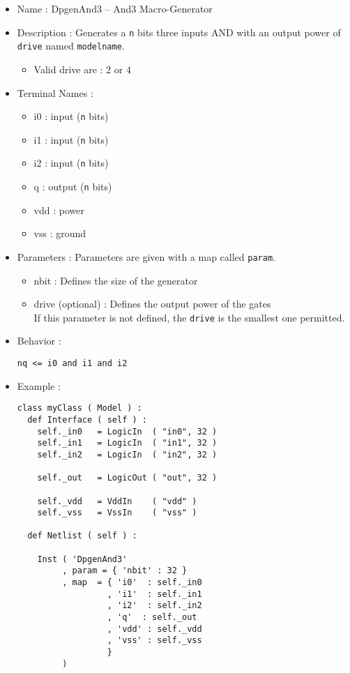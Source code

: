 \begin{itemize}
    \item Name : DpgenAnd3 -- And3 Macro-Generator
    \item Description : Generates a \verb-n- bits three inputs AND with an output power of \verb-drive- named \verb-modelname-.
    \begin{itemize}
        \item Valid drive are : 2 or 4
    \end{itemize}
    \item Terminal Names :
    \begin{itemize}
        \item i0 : input (\verb-n- bits)
        \item i1 : input (\verb-n- bits)
        \item i2 : input (\verb-n- bits)
        \item q : output (\verb-n- bits)
        \item vdd : power
        \item vss : ground
    \end{itemize}
    \item Parameters : Parameters are given with a map called \verb-param-.
    \begin{itemize}
        \item nbit : Defines the size of the generator
        \item drive (optional) : Defines the output power of the gates\\If this parameter is not defined, the \verb-drive- is the smallest one permitted.
    \end{itemize}
    \item Behavior :
\begin{verbatim}
nq <= i0 and i1 and i2
\end{verbatim}
    \item Example :
\begin{verbatim}
class myClass ( Model ) :
  def Interface ( self ) :
    self._in0   = LogicIn  ( "in0", 32 )
    self._in1   = LogicIn  ( "in1", 32 )
    self._in2   = LogicIn  ( "in2", 32 )
    
    self._out   = LogicOut ( "out", 32 )

    self._vdd   = VddIn    ( "vdd" )
    self._vss   = VssIn    ( "vss" )
    
  def Netlist ( self ) :
      
    Inst ( 'DpgenAnd3'
         , param = { 'nbit' : 32 }
         , map  = { 'i0'  : self._in0
                  , 'i1'  : self._in1
                  , 'i2'  : self._in2
                  , 'q'  : self._out
                  , 'vdd' : self._vdd
                  , 'vss' : self._vss
                  }
         )
\end{verbatim}
\end{itemize}
